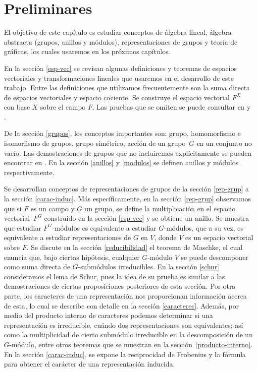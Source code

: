 \documentclass[12pt]{book}
\theoremstyle{definition}
\newcounter{in}
\newcounter{ini}
\begin{document}
\chapter{Preliminares}
\label{preliminares}

El objetivo de este capítulo es estudiar conceptos de álgebra
lineal, álgebra abstracta (grupos, anillos y módulos), representaciones
de grupos y teoría de gráficas, los cuales usaremos en los próximos capítulos. 

En la sección \ref{esp-vec} se revisan algunas definiciones y teoremas
de espacios vectoriales y transformaciones lineales que usaremos en el
desarrollo de este trabajo. Entre las definiciones que utilizamos
frecuentemente son la suma directa de espacios vectoriales y espacio
cociente. Se construye el espacio vectorial $F^{X}$ con base $X$ sobre el
campo $F$. Las pruebas que se
omiten se puede consultar en \cite{friedberg1982algebra} y
\cite{herstein1990algebra}. 

De la sección \ref{grupos}, los conceptos importantes son: grupo, homomorfismo e isomorfismo de grupos, grupo
simétrico, acción de un grupo~$G$ en un conjunto no vacío.
Las demostraciones de
grupos que no incluiremos explícitamente se pueden encontrar en
\cite{fraleigh}. En la sección \ref{anillos} y \ref{modulos} se
definen anillos y módulos respectivamente.

Se desarrollan conceptos de representaciones de grupos de la sección
\ref{rep-grup} a la sección \ref{carac-induc}. Más específicamente, en
la sección \ref{rep-grup} observamos que si $F$ es un campo y $G$ un
grupo, se define la multiplicación en el espacio vectorial~$F^{G}$
construido en la sección \ref{esp-vec} y se obtiene un anillo. Se
muestra que estudiar
$F^{G}$-módulos es equivalente a estudiar $G$-módulos, que a su vez, es
equivalente a estudiar representaciones de $G$ en $V$, donde $V$ es un
espacio vectorial sobre $F$. Se discute en la sección
\ref{reducibilidad} el teorema de Maschke, el cual
enuncia que, bajo ciertas hipótesis, cualquier $G$-módulo $V$ se puede descomponer como suma
directa de $G$-submódulos irreducibles. En la sección \ref{schur}
consideramos el lema de Schur, pues la idea de su prueba es similar a
las demostraciones de ciertas proposiciones posteriores de esta sección. Por otra parte, los caracteres de
una representación nos proporcionan información acerca de esta, lo
cual se describe con detalle en la sección \ref{caracteres}. Además,
por medio del producto interno de caracteres podemos determinar si una
representación es irreducible, cuándo dos representaciones son
equivalentes; así como la multiplicidad de cierto submódulo irreducible en la
descomposición de un $G$-módulo, entre otros teoremas que se muestran en la
sección~\ref{producto-interno}. En la sección \ref{carac-induc}, se expone la reciprocidad de
Frobenius y la fórmula para obtener el carácter de una representación
inducida.
\end{document}
